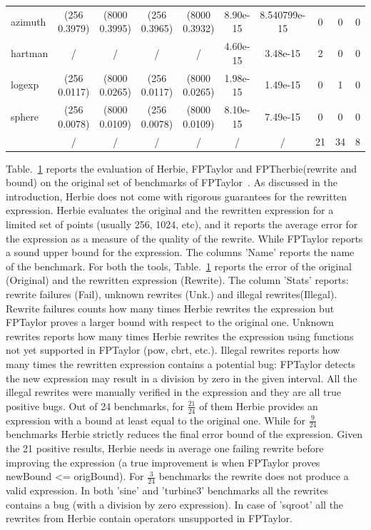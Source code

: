 \documentclass[runningheads]{llncs}
\begin{document}
\begin{table}[h]
\begin{adjustbox}{center}
\begin{tabular}{l|c|c|c|c|c|c|c|c|c|}
		azimuth &(256 0.3979) &(8000 0.3995)&(256 0.3965) &(8000 0.3932)& 8.90e-15 & 8.540799e-15 & 0& 0& 0\\
		hartman &/&/&/&/& 4.60e-15 & 3.48e-15& 2& 0& 0\\
		logexp &(256 0.0117) &(8000 0.0265)&(256 0.0117) &(8000 0.0265)& 1.98e-15& 1.49e-15& 0& 1& 0\\
		sphere &(256 0.0078) &(8000 0.0109)&(256 0.0078) &(8000 0.0109)& 8.10e-15& 7.49e-15& 0& 0& 0\\
		\hline
		&/&/&/&/ & / & / & 21 & 34 &8\\		
		\hline
	\end{tabular}
	\label{tab:table}
\end{adjustbox}
\end{table}



Table.~\ref{tab:table} reports the evaluation of Herbie, FPTaylor and FPTherbie(rewrite and bound) on the original set of benchmarks of FPTaylor~\cite{fptaylor}. As discussed in the introduction, Herbie does not come with rigorous guarantees for the rewritten expression. Herbie evaluates the original and the rewritten expression for a limited set of points (usually 256, 1024, etc), and it reports the average error for the expression as a measure of the quality of the rewrite. While FPTaylor reports a sound upper bound for the expression.
The columns 'Name' reports the name of the benchmark. For both the tools, Table.~\ref{tab:table} reports the error of the original (Original) and the rewritten expression (Rewrite). The column 'Stats' reports: rewrite failures (Fail), unknown rewrites (Unk.) and illegal rewrites(Illegal). Rewrite failures counts how many times Herbie rewrites the expression but FPTaylor proves a larger bound with respect to the original one. Unknown rewrites reports how many times Herbie rewrites the expression using functions not yet supported in FPTaylor (pow, cbrt, etc.). Illegal rewrites reports how many times the rewritten expression contains a potential bug: FPTaylor detects the new expression may result in a division by zero in the given interval. All the illegal rewrites were manually verified in the expression and they are all true positive bugs.
Out of 24 benchmarks, for $\frac{21}{24}$ of them Herbie provides an expression with a bound at least equal to the original one. While for $\frac{9}{24}$ benchmarks Herbie strictly reduces the final error bound of the expression. 
Given the 21 positive results, Herbie needs in average one failing rewrite before improving the expression (a true improvement is when FPTaylor proves newBound <= origBound).
For $\frac{3}{24}$ benchmarks the rewrite does not produce a valid expression. In both 'sine' and 'turbine3' benchmarks all the rewrites contains a bug (with a division by zero expression). 
In case of 'sqroot' all the rewrites from Herbie contain operators unsupported in FPTaylor.
\end{document}
